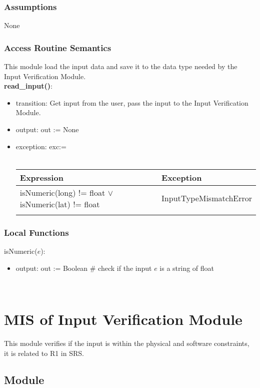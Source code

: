 \documentclass[12pt, titlepage]{article}
\begin{document}
\subsubsection{Assumptions}
None

\subsubsection{Access Routine Semantics}
This module load the input data and save it to the data type needed by the Input Verification Module.\\
\noindent \textbf{read\_input()}:
\begin{itemize}
\item transition: Get input from the user, pass the input to the Input Verification Module.
\item output: out := None
\item exception: exc:= \\ \\ 
 \begin{tabular}{p{10cm} p{3.5cm} }
 \hline
 \textbf{Expression} & \textbf{Exception}  \\

  \hline
     isNumeric(long) != float $\lor$ isNumeric(lat) != float   & InputTypeMismatchError \\ \\

  \hline
 \end{tabular}
\end{itemize}


\subsubsection{Local Functions}
\noindent isNumeric($e$):
\begin{itemize}
\item output: out := Boolean \# check if the input $e$ is a string of float 
\end{itemize}
  
  
~\newpage

\section{MIS of Input Verification Module} \label{inputVerificationModule} 
This module verifies if the input is within the physical and software constraints, it is related to R1 in SRS.
\subsection{Module}
\end{document}

